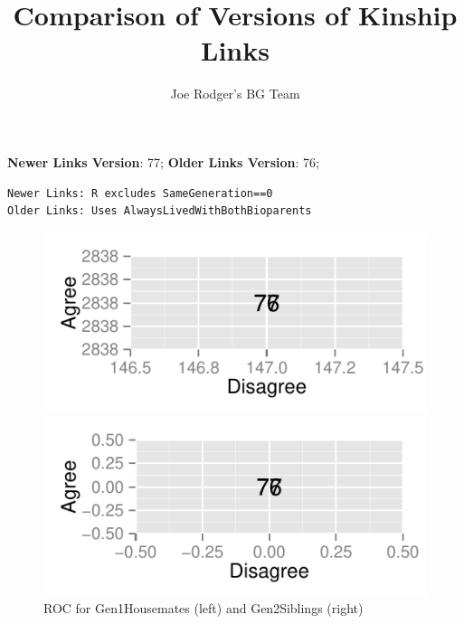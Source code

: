 \documentclass[a4paper]{article}\usepackage[]{graphicx}\usepackage[]{color}
\title{Comparison of Versions of Kinship Links}
\author{Joe Rodger's BG Team}
\makeatletter
\def\maxwidth{ %
  \ifdim\Gin@nat@width>\linewidth
    \linewidth
  \else
    \Gin@nat@width
  \fi
}
\newenvironment{kframe}{%
 \def\at@end@of@kframe{}%
 \ifinner\ifhmode%
  \def\at@end@of@kframe{\end{minipage}}%
  \begin{minipage}{\columnwidth}%
 \fi\fi%
 \def\FrameCommand##1{\hskip\@totalleftmargin \hskip-\fboxsep
 \colorbox{shadecolor}{##1}\hskip-\fboxsep
     \hskip-\linewidth \hskip-\@totalleftmargin \hskip\columnwidth}%
 \MakeFramed {\advance\hsize-\width
   \@totalleftmargin\z@ \linewidth\hsize
   \@setminipage}}%
 {\par\unskip\endMakeFramed%
 \at@end@of@kframe}
\newenvironment{knitrout}{}{} %
\makeatother
\begin{document}
\maketitle

\setlength{\parindent}{0pt}%







\textbf{Newer Links Version}: 77;
\textbf{Older Links Version}: 76;

\begin{knitrout}
\color{fgcolor}\begin{kframe}
\begin{verbatim}
Newer Links: R excludes SameGeneration==0
Older Links: Uses AlwaysLivedWithBothBioparents
\end{verbatim}
\end{kframe}
\end{knitrout}


\begin{figure}[htbp]
\begin{knitrout}
\color{fgcolor}
\includegraphics[width=\maxwidth]{figure/unnamed-chunk-31} 

\includegraphics[width=\maxwidth]{figure/unnamed-chunk-32} 

\end{knitrout}

\caption{ROC for Gen1Housemates (left) and Gen2Siblings (right)}
\end{figure}
\end{document}
